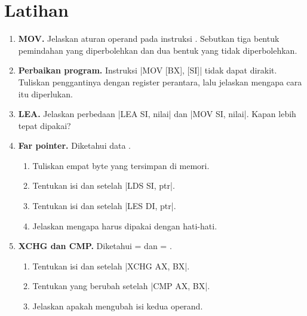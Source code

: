 \section{Latihan}
\label{sec:latihan-bab8}

\begin{enumerate}
    \item \textbf{MOV.} Jelaskan aturan operand pada instruksi
          . Sebutkan tiga bentuk pemindahan yang
          diperbolehkan dan dua bentuk yang tidak diperbolehkan.

    \item \textbf{Perbaikan program.} Instruksi
          \lstasm|MOV [BX], [SI]| tidak dapat dirakit. Tuliskan
          penggantinya dengan register perantara, lalu jelaskan
          mengapa cara itu diperlukan.

    \item \textbf{LEA.} Jelaskan perbedaan
          \lstasm|LEA SI, nilai| dan \lstasm|MOV SI, nilai|.
          Kapan  lebih tepat dipakai?

    \item \textbf{Far pointer.} Diketahui data
          .
          \begin{enumerate}
              \item Tuliskan empat byte yang tersimpan di memori.
              \item Tentukan isi  dan  setelah
                    \lstasm|LDS SI, ptr|.
              \item Tentukan isi  dan  setelah
                    \lstasm|LES DI, ptr|.
              \item Jelaskan mengapa  harus dipakai dengan
                    hati-hati.
          \end{enumerate}

    \item \textbf{XCHG dan CMP.} Diketahui  = 
          dan  = .
          \begin{enumerate}
              \item Tentukan isi  dan  setelah
                    \lstasm|XCHG AX, BX|.
              \item Tentukan  yang berubah setelah
                    \lstasm|CMP AX, BX|.
              \item Jelaskan apakah  mengubah isi kedua
                    operand.
          \end{enumerate}


\end{enumerate}
